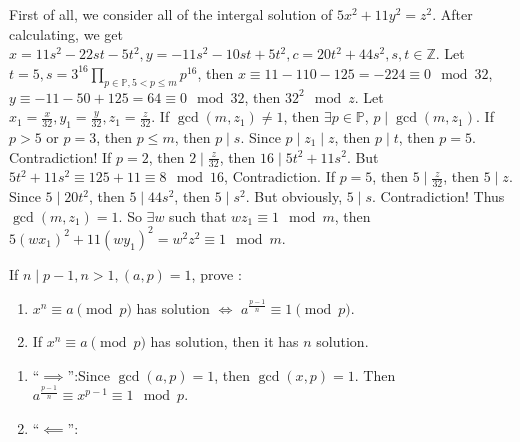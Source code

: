 \documentclass{ctexart}
\begin{document}
\begin{solution}
  First of all, we consider all of the intergal solution of \(5x^2 + 11 y^2 = z^2\).
  After calculating, we get \(x = 11s^2 - 22 st -5 t^2,y=-11s^2 -10st + 5t^2,c=20t^2 + 44s^2, s,t \in \mathbb{Z}\).
  Let \(t = 5, s= 3^{16} \prod_{p \in \mathbb{P},5 < p \leq m} p^{16}\), then \(x \equiv 11 -110-125 =-224 \equiv 0 \mod 32\),
  \(y \equiv -11-50 + 125 =64 \equiv 0 \mod 32\), then \(32^2 \mod z\).
  Let \(x_1=\frac{x}{32},y_1=\frac{y}{32},z_1=\frac{z}{32}\). If \(\gcd(m,z_1) \neq 1\), then \(\exists p \in \mathbb{P}\),
  \(p \mid \gcd(m,z_1)\). If \(p >5 \) or \(p =3\), then \(p \leq m\), then \(p \mid s\).
  Since \(p \mid z_1 \mid z\), then \(p \mid t\), then \(p=5\). Contradiction!
  If \(p=2\), then \(2 \mid \frac{z}{32}\), then \(16 \mid 5t^2 + 11s^2\).
  But \(5t^2 + 11s^2 \equiv 125 + 11 \equiv 8 \mod 16\), Contradiction.
  If \(p=5\), then \(5 \mid \frac{z}{32}\), then \(5 \mid z\).
  Since \(5 \mid 20t^2 \), then \(5 \mid 44s^2\), then \(5 \mid s^2\).
  But obviously, \(5 \mid s\). Contradiction!
  Thus \(\gcd(m,z_1)=1\). So \(\exists w\) such that \(w z_1 \equiv 1 \mod m\), then \(5(w x_1)^2 + 11 (w y_1)^2 = w^2z^2 \equiv 1 \mod m\).
\end{solution}

\begin{problem}\label{pro:4}
  If \(n \mid p-1, n > 1,(a,p)=1\), prove :
  \begin{enumerate}
    \item \(x^n \equiv a \pmod{ p}\) has solution \(\iff\) \(a^{\frac{p-1}{n}} \equiv 1 \pmod{ p}\).
    \item If \(x^n \equiv a \pmod{ p}\) has solution, then it has \(n\) solution.
  \end{enumerate}
\end{problem}
\begin{solution}
  \begin{enumerate}
    \item ``\(\implies\)'':Since \(\gcd(a,p)=1\), then \(\gcd(x,p)=1\). Then \(a^{\frac{p-1}{n}} \equiv x^{p-1} \equiv 1 \mod p\).
    \item ``\(\impliedby\)'':
  \end{enumerate}

\end{solution}
\end{document}
